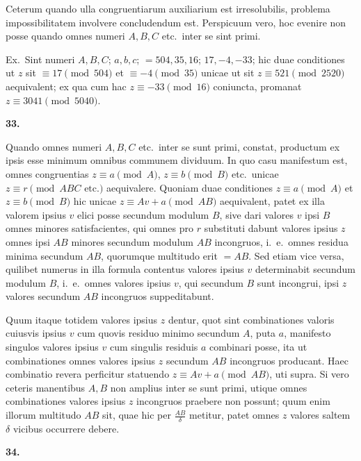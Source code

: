 \documentclass[12pt,a4paper]{article}
\theoremstyle{plain}
\theoremstyle{definition}
\theoremstyle{remark}
\begin{document}
Ceterum quando ulla congruentiarum auxiliarium est irresolubilis, problema impossibilitatem involvere concludendum est. Perspicuum vero, hoc evenire non posse quando omnes numeri $A, B, C$ etc.\ inter se sint primi.

Ex.\ Sint numeri $A, B, C$; $a, b, c$; $= 504, 35, 16$; $17, -4, -33$; hic duae conditiones ut $z$ sit $\equiv 17 \pmod{504}$ et $\equiv -4 \pmod{35}$ unicae ut sit $z \equiv 521 \pmod{2520}$ aequivalent; ex qua cum hac $z \equiv -33 \pmod{16}$ coniuncta, promanat $z \equiv 3041 \pmod{5040}$.

\textbf{33.}

Quando omnes numeri $A, B, C$ etc.\ inter se sunt primi, constat, productum ex ipsis esse minimum omnibus communem dividuum. In quo casu manifestum est, omnes congruentias $z \equiv a \pmod{A}$, $z \equiv b \pmod{B}$ etc.\ unicae $z \equiv r \pmod{ABC \text{ etc.}}$ aequivalere. Quoniam duae conditiones $z \equiv a \pmod{A}$ et $z \equiv b \pmod{B}$ hic unicae $z \equiv Av + a \pmod{AB}$ aequivalent, patet ex illa valorem ipsius $v$ elici posse secundum modulum $B$, sive dari valores $v$ ipsi $B$ omnes minores satisfacientes, qui omnes pro $r$ substituti dabunt valores ipsius $z$ omnes ipsi $AB$ minores secundum modulum $AB$ incongruos, i.~e.\ omnes residua minima secundum $AB$, quorumque multitudo erit $= AB$. Sed etiam vice versa, quilibet numerus in illa formula contentus valores ipsius $v$ determinabit secundum modulum $B$, i.~e.\ omnes valores ipsius $v$, qui secundum $B$ sunt incongrui, ipsi $z$ valores secundum $AB$ incongruos suppeditabunt.

Quum itaque totidem valores ipsius $z$ dentur, quot sint combinationes valoris cuiusvis ipsius $v$ cum quovis residuo minimo secundum $A$, puta $a$, manifesto singulos valores ipsius $v$ cum singulis residuis $a$ combinari posse, ita ut combinationes omnes valores ipsius $z$ secundum $AB$ incongruos producant. Haec combinatio revera perficitur statuendo $z \equiv Av + a \pmod{AB}$, uti supra. Si vero ceteris manentibus $A, B$ non amplius inter se sunt primi, utique omnes combinationes valores ipsius $z$ incongruos praebere non possunt; quum enim illorum multitudo $AB$ sit, quae hic per $\frac{AB}{\delta}$ metitur, patet omnes $z$ valores saltem $\delta$ vicibus occurrere debere.

\textbf{34.}
\end{document}

